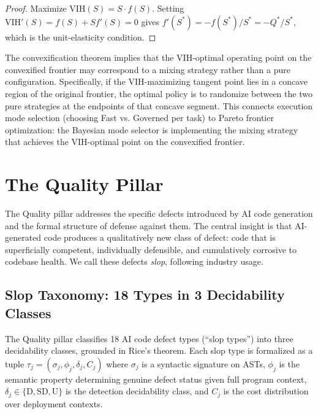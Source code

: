 \documentclass[11pt, a4paper, logo, copyright]{googledeepmind}
\begin{document}
\begin{proof}
Maximize $\text{VIH}(S) = S \cdot f(S)$. Setting $\text{VIH}'(S) = f(S) + S f'(S) = 0$ gives $f'(S^*) = -f(S^*)/S^* = -Q^*/S^*$, which is the unit-elasticity condition.
\end{proof}

The convexification theorem implies that the VIH-optimal operating point on the convexified frontier may correspond to a mixing strategy rather than a pure configuration. Specifically, if the VIH-maximizing tangent point lies in a concave region of the original frontier, the optimal policy is to randomize between the two pure strategies at the endpoints of that concave segment. This connects execution mode selection (choosing Fast vs. Governed per task) to Pareto frontier optimization: the Bayesian mode selector is implementing the mixing strategy that achieves the VIH-optimal point on the convexified frontier.
\section{The Quality Pillar}
\label{sec:quality}

The Quality pillar addresses the specific defects introduced by AI code generation and the formal structure of defense against them. The central insight is that AI-generated code produces a qualitatively new class of defect: code that is superficially competent, individually defensible, and cumulatively corrosive to codebase health. We call these defects \emph{slop}, following industry usage.

\subsection{Slop Taxonomy: 18 Types in 3 Decidability Classes}

The Quality pillar classifies 18 AI code defect types (``slop types'') into three decidability classes, grounded in Rice's theorem. Each slop type is formalized as a tuple $\tau_j = (\sigma_j, \phi_j, \delta_j, C_j)$ where $\sigma_j$ is a syntactic signature on ASTs, $\phi_j$ is the semantic property determining genuine defect status given full program context, $\delta_j \in \{\mathrm{D}, \mathrm{SD}, \mathrm{U}\}$ is the detection decidability class, and $C_j$ is the cost distribution over deployment contexts.
\end{document}
